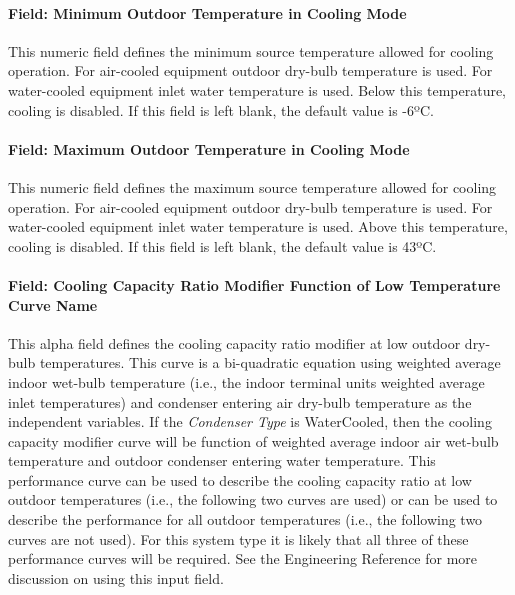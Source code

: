 \paragraph{Field: Minimum Outdoor Temperature in Cooling Mode}\label{field-minimum-outdoor-temperature-in-cooling-mode-000}

This numeric field defines the minimum source temperature allowed for cooling operation. For air-cooled equipment outdoor dry-bulb temperature is used. For water-cooled equipment inlet water temperature is used. Below this temperature, cooling is disabled. If this field is left blank, the default value is -6ºC.

\paragraph{Field: Maximum Outdoor Temperature in Cooling Mode}\label{field-maximum-outdoor-temperature-in-cooling-mode-000}

This numeric field defines the maximum source temperature allowed for cooling operation. For air-cooled equipment outdoor dry-bulb temperature is used. For water-cooled equipment inlet water temperature is used. Above this temperature, cooling is disabled. If this field is left blank, the default value is 43ºC.

\paragraph{Field: Cooling Capacity Ratio Modifier Function of Low Temperature Curve Name}\label{field-cooling-capacity-ratio-modifier-function-of-low-temperature-curve-name}

This alpha field defines the cooling capacity ratio modifier at low outdoor dry-bulb temperatures. This curve is a bi-quadratic equation using weighted average indoor wet-bulb temperature (i.e., the indoor terminal units weighted average inlet temperatures) and condenser entering air dry-bulb temperature as the independent variables. If the \textit{Condenser Type} is WaterCooled, then the cooling capacity modifier curve will be function of weighted average indoor air wet-bulb temperature and outdoor condenser entering water temperature. This performance curve can be used to describe the cooling capacity ratio at low outdoor temperatures (i.e., the following two curves are used) or can be used to describe the performance for all outdoor temperatures (i.e., the following two curves are not used). For this system type it is likely that all three of these performance curves will be required. See the Engineering Reference for more discussion on using this input field.

